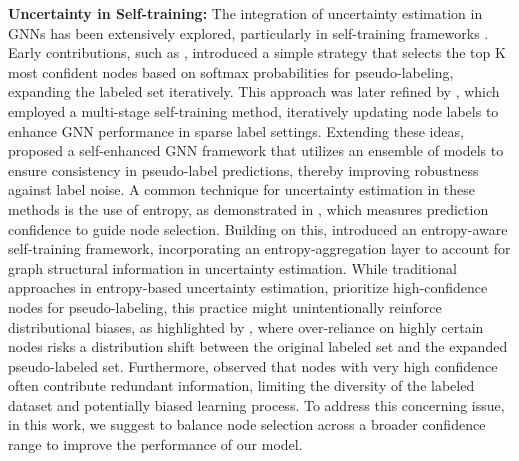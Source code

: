\textbf{Uncertainty in Self-training: }
The integration of uncertainty estimation in GNNs has been extensively explored, particularly in self-training frameworks \cite{wang2021be,yang2021self,zhao2021entropy}. Early contributions, such as \cite{li2018deeper}, introduced a simple strategy that selects the top K most confident nodes based on softmax probabilities for pseudo-labeling, expanding the labeled set iteratively. This approach was later refined by \cite{sun2020multi}, which employed a multi-stage self-training method, iteratively updating node labels to enhance GNN performance in sparse label settings. Extending these ideas, \cite{yang2021self} proposed a self-enhanced GNN framework that utilizes an ensemble of models to ensure consistency in pseudo-label predictions, thereby improving robustness against label noise. A common technique for uncertainty estimation in these methods is the use of entropy, as demonstrated in \cite{cai2017active, zhang2021alg}, which measures prediction confidence to guide node selection. Building on this, \cite{zhao2021entropy} introduced an entropy-aware self-training framework, incorporating an entropy-aggregation layer to account for graph structural information in uncertainty estimation. While traditional approaches in entropy-based uncertainty estimation, prioritize high-confidence nodes for pseudo-labeling, this practice might unintentionally reinforce distributional biases, as highlighted by \cite{liu2022confidence}, where over-reliance on highly certain nodes risks a distribution shift between the original labeled set and the expanded pseudo-labeled set. Furthermore, \cite{li2023informative} observed that nodes with very high confidence often contribute redundant information, limiting the diversity of the labeled dataset and potentially biased learning process. To address this concerning issue, in this work, we suggest to balance node selection across a broader confidence range to improve the performance of our model.
